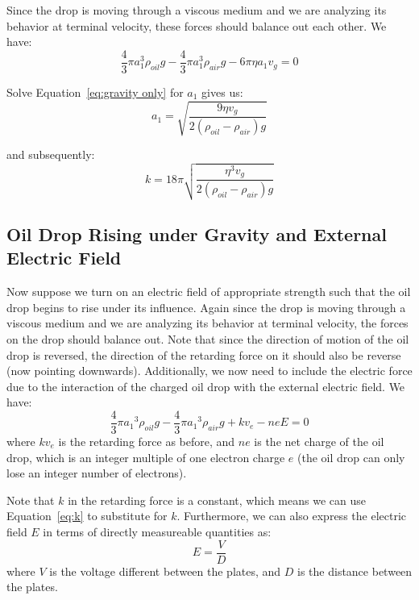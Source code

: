 \documentclass{article}
\begin{document}
Since the drop is moving through a viscous medium and we are analyzing its behavior at terminal velocity, these forces should balance out each other. We have:
\begin{equation} \label{eq:gravity only}
    \frac{4}{3} \pi a_1^3 \rho_{oil} g - \frac{4}{3} \pi a_1^3 \rho_{air} g - 6 \pi \eta a_1 v_g = 0
\end{equation}

Solve Equation~\ref{eq:gravity only} for $a_1$ gives us:
\begin{equation} \label{eq:a1}
    a_1 = \sqrt{\frac{9 \eta v_g}{2 (\rho_{oil} - \rho_{air}) g}}
\end{equation}

and subsequently:
\begin{equation} \label{eq:k}
    k = 18 \pi \sqrt{\frac{\eta^3 v_g}{2 (\rho_{oil} - \rho_{air}) g}}
\end{equation}

\subsection{Oil Drop Rising under Gravity and External Electric Field}
Now suppose we turn on an electric field of appropriate strength such that the oil drop begins to rise under its influence. Again since the drop is moving through a viscous medium and we are analyzing its behavior at terminal velocity, the forces on the drop should balance out. Note that since the direction of motion of the oil drop is reversed, the direction of the retarding force on it should also be reverse (now pointing downwards). Additionally, we now need to include the electric force due to the interaction of the charged oil drop with the external electric field. We have:
\begin{equation} \label{eq:gravity+E}
    \frac{4}{3} \pi {a_1}^3 \rho_{oil} g - \frac{4}{3} \pi {a_1}^3 \rho_{air} g + k v_e - n e E = 0
\end{equation}
where $k v_e$ is the retarding force as before, and $n e$ is the net charge of the oil drop, which is an integer multiple of one electron charge $e$ (the oil drop can only lose an integer number of electrons).

Note that $k$ in the retarding force is a constant, which means we can use Equation~\ref{eq:k} to substitute for $k$. Furthermore, we can also express the electric field $E$ in terms of directly measureable quantities as:
\begin{equation} \label{eq:E}
    E = \frac{V}{D}
\end{equation}
where $V$ is the voltage different between the plates, and $D$ is the distance between the plates.
\end{document}
